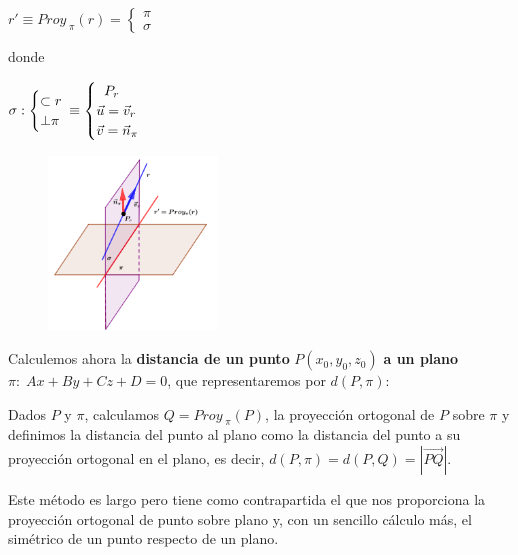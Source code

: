 \begin{multicols}{2}



$r'\equiv Proy_{\;\pi}(r)=\begin{cases} \pi \\ \sigma \end{cases}$

donde

$\sigma:
	\begin{cases}\subset r \\ \bot \pi \end{cases} \hspace{-3mm}\equiv \begin{cases} \;\;P_r\\ \vec u=\vec v_r\\ \vec v=\vec n_{\pi} \end{cases}$

\begin{figure}[H]
		\centering
		\includegraphics[width=0.4\textwidth]{imagenes/imagenes11/T11IM12b.png}
	\end{figure}
\end{multicols}







Calculemos ahora la \textbf{distancia de un punto} $P(x_0,y_0,z_0)$ \textbf{a un plano} $\pi:\; Ax+By+Cz+D=0$, que representaremos por $d(P,\pi)$:

Dados $P$ y $\pi$, calculamos $Q=Proy_{\;\pi}(P)$, la proyección ortogonal de $P$ sobre $\pi$ y definimos la distancia del punto al plano como la distancia del punto a su proyección ortogonal en el plano, es decir, $d(P,\pi)=d(P,Q)=|\overrightarrow{PQ}|$.

Este método es largo pero tiene como contrapartida el que nos proporciona la proyección ortogonal de punto sobre plano y, con un sencillo cálculo más, el simétrico de un punto respecto de un plano.

